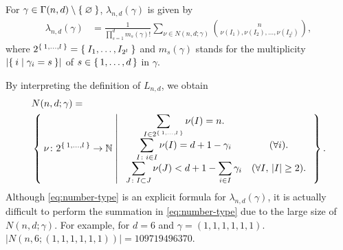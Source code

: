 \documentclass{wstmp}
\begin{document}
\begin{proposition}
\label{prop:number-type}
For $\gamma\in \Gamma(n,d) \setminus\Set{\varnothing}$,
$\lambda_{n,d}(\gamma)$ is given by
\begin{align}
\lambda_{n,d}(\gamma)
&=\frac{1}{\prod_{s=1}^d m_s(\gamma) !}
\sum_{\nu\in N(n,d;\gamma)} 
\binom{n}{\nu(I_1), \nu(I_2),\ldots, \nu(I_{2^l})},
\label{eq:number-type}
\end{align}
where 
$2^{\Set{1,\ldots,l}}=\Set{I_1,\ldots,I_{2^l}}$
and
$m_s(\gamma)$ stands for
the multiplicity ${\left|{\Set{i|\gamma_i=s}}\right|}$ 
of $s\in \set{1,\dots,d}$ in $\gamma$.
\end{proposition}

\begin{remark}
By interpreting the definition of $L_{n,d}$,
we obtain
\begin{align*}
&N(n,d;\gamma)
=\\ &
\Set{
\nu\colon 2^{\Set{1,\ldots,l}}\to{\mathbb{N}}
|
\begin{array}{cc}
\displaystyle
\sum_{I\in 2^{\Set{1,\ldots,l}}}\nu(I)=n.
&
\\
\displaystyle
\sum_{I\colon i\in I} \nu(I) = d+1-\gamma_i 
&(\forall i).
\\
\displaystyle
\sum_{J\colon I\subset J} \nu(J)  <  d+1 - \sum_{i\in I}\gamma_i
& (\forall I,\,{\left|{I}\right|}\ge 2).
\end{array}
}.
\end{align*}
Although 
\eqref{eq:number-type}
is an explicit formula for $\lambda_{n,d}(\gamma)$, 
it is actually difficult to perform the summation in
\eqref{eq:number-type} due to the large size of $N(n,d;\gamma)$.
For example, for $d=6$ and $\gamma=(1,1,1,1,1,1)$.
${\left|{N(n,6;(1,1,1,1,1,1))}\right|}=109719496370$. 
\end{remark}
\end{document}

